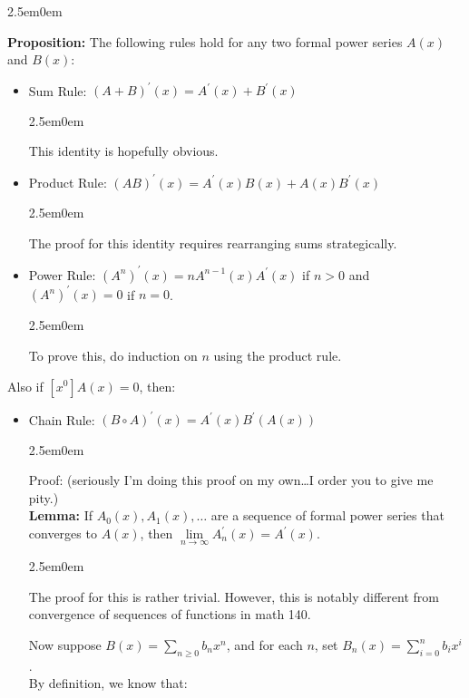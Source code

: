\documentclass{book}
\newcommand{\hTwo}{%
\color{MidnightBlue}%
   \fontsize{13}{15}\selectfont%
}
\newcommand{\hThree}{%
   \color{PineGreen!85!Orange}
   \fontsize{12}{14}\selectfont%
}
\newcommand{\hFour}{%
   \color{Cyan}
   \fontsize{12}{14}\selectfont%
}
\newcommand{\myComment}{%
   \color{RawerSienna}%
   \fontsize{12}{14}\selectfont%
}
\newenvironment{myIndent}{%
   \begin{adjustwidth}{2.5em}{0em}%
}{%
   \end{adjustwidth}%
}
\newcommand{\blab}[1]{\textbf{#1}}
\newcommand{\retTwo}{\hfill\bigbreak}
\begin{document}
\begin{myIndent}\hTwo
   \blab{Proposition:} The following rules hold for any two formal power series $A(x)$ and $B(x)$:
   \begin{itemize}
      \item Sum Rule: $(A + B)^\prime(x) = A^\prime(x) + B^\prime(x)$
      \begin{myIndent}\hThree
         This identity is hopefully obvious.\\ [-12pt]
      \end{myIndent}
      \item Product Rule: $(AB)^\prime(x) = A^\prime(x) B(x) + A(x) B^\prime(x)$
      \begin{myIndent}\hThree
         The proof for this identity requires rearranging sums strategically.\\ [-12pt]
      \end{myIndent}
      \item Power Rule: $(A^n)^\prime(x) = n A^{n-1}(x) A^\prime(x)$ if $n > 0$ and $(A^n)^\prime(x) = 0$ if $n = 0$.
      \begin{myIndent}\hThree
         To prove this, do induction on $n$ using the product rule.\newpage
      \end{myIndent}
   \end{itemize}
   
   Also if $[x^0]A(x) = 0$, then:
   \begin{itemize}
      \item Chain Rule: $(B \circ A)^\prime(x) = A^\prime(x) B^\prime(A(x))$
      
      \begin{myIndent}\hThree
         Proof: {\myComment(seriously I'm doing this proof on my own\dots I order you to give me pity.)}\\ [-6pt]

         \blab{Lemma:} If $A_0(x), A_1(x), \ldots$ are a sequence of formal power series that\\ converges to $A(x)$, then $\lim\limits_{n \rightarrow \infty} A_n^\prime(x) = A^\prime(x)$.

         \begin{myIndent}\hFour
            The proof for this is rather trivial. However, this is notably different from convergence of sequences of functions in math 140.\retTwo
         \end{myIndent}

         Now suppose $B(x) = \sum\limits_{n \geq 0}b_nx^n$, and for each $n$, set $B_n(x) = \sum\limits_{i = 0}^n b_i x^i$.\\ [2pt]
         By definition, we know that:\\ [-18pt]
         

\end{myIndent}
\end{itemize}
\end{myIndent}
\end{document}
